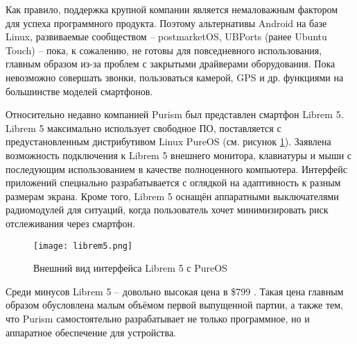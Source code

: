 Как правило, поддержка крупной компании является немаловажным фактором для успеха программного продукта.
Поэтому альтернативы Android на базе Linux, развиваемые сообществом -- postmarketOS, UBPorts (ранее Ubuntu Touch) -- пока, к сожалению, не готовы для повседневного использования, главным образом из-за проблем с закрытыми драйверами оборудования.
Пока невозможно совершать звонки, пользоваться камерой, GPS и др. функциями на большинстве моделей смартфонов.

Относительно недавно компанией Purism был представлен смартфон Librem 5.
Librem 5 максимально использует свободное ПО, поставляется с предустановленным дистрибутивом Linux PureOS (см. рисунок \ref{fig:librem5}).
Заявлена возможность подключения к Librem 5 внешнего монитора, клавиатуры и мыши с последующим использованием в качестве полноценного компьютера.
Интерфейс приложений специально разрабатывается с оглядкой на адаптивность к разным размерам экрана.
Кроме того, Librem 5 оснащён аппаратными выключателями радиомодулей для ситуаций, когда пользователь хочет минимизировать риск отслеживания через смартфон.

\begin{figure}[ht]
    \centering
    \texttt{[image: librem5.png]}  
    \caption{Внешний вид интерфейса Librem 5 с PureOS}
	\label{fig:librem5}
\end{figure}

Среди минусов Librem 5 -- довольно высокая цена в \$799 \cite{librem5}.
Такая цена главным образом обусловлена малым объёмом первой выпущенной партии, а также тем, что Purism самостоятельно разрабатывает не только программное, но и аппаратное обеспечение для устройства.

